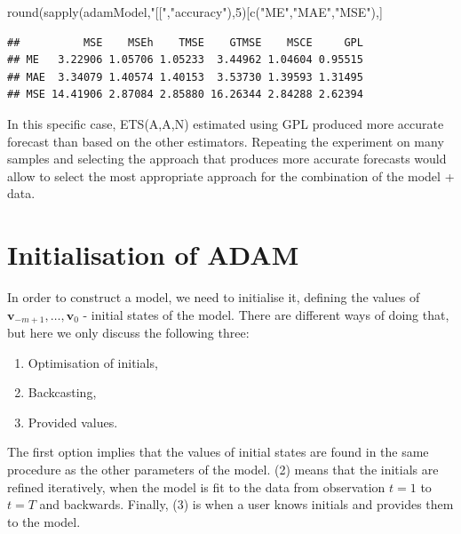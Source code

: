 \documentclass[
]{book}
\newenvironment{Shaded}{\begin{snugshade}}{\end{snugshade}}
\newcommand{\DecValTok}[1]{\textcolor[rgb]{0.00,0.00,0.81}{#1}}
\newcommand{\FunctionTok}[1]{\textcolor[rgb]{0.00,0.00,0.00}{#1}}
\newcommand{\NormalTok}[1]{#1}
\newcommand{\StringTok}[1]{\textcolor[rgb]{0.31,0.60,0.02}{#1}}
\providecommand{\tightlist}{%
  \setlength{\itemsep}{0pt}\setlength{\parskip}{0pt}}
\theoremstyle{definition}
\theoremstyle{definition}
\theoremstyle{definition}
\theoremstyle{definition}
\theoremstyle{remark}
\begin{document}
\begin{Shaded}
\begin{Highlighting}[]
\FunctionTok{round}\NormalTok{(}\FunctionTok{sapply}\NormalTok{(adamModel,}\StringTok{"[["}\NormalTok{,}\StringTok{"accuracy"}\NormalTok{),}\DecValTok{5}\NormalTok{)[}\FunctionTok{c}\NormalTok{(}\StringTok{"ME"}\NormalTok{,}\StringTok{"MAE"}\NormalTok{,}\StringTok{"MSE"}\NormalTok{),]}
\end{Highlighting}
\end{Shaded}

\begin{verbatim}
##          MSE    MSEh    TMSE    GTMSE    MSCE     GPL
## ME   3.22906 1.05706 1.05233  3.44962 1.04604 0.95515
## MAE  3.34079 1.40574 1.40153  3.53730 1.39593 1.31495
## MSE 14.41906 2.87084 2.85880 16.26344 2.84288 2.62394
\end{verbatim}

In this specific case, ETS(A,A,N) estimated using GPL produced more accurate forecast than based on the other estimators. Repeating the experiment on many samples and selecting the approach that produces more accurate forecasts would allow to select the most appropriate approach for the combination of the model + data.

\hypertarget{ADAMInitialisation}{%
\section{Initialisation of ADAM}\label{ADAMInitialisation}}

In order to construct a model, we need to initialise it, defining the values of \(\mathbf{v}_{-m+1}, \dots, \mathbf{v}_0\) - initial states of the model. There are different ways of doing that, but here we only discuss the following three:

\begin{enumerate}
\def\labelenumi{\arabic{enumi}.}
\tightlist
\item
  Optimisation of initials,
\item
  Backcasting,
\item
  Provided values.
\end{enumerate}

The first option implies that the values of initial states are found in the same procedure as the other parameters of the model. (2) means that the initials are refined iteratively, when the model is fit to the data from observation \(t=1\) to \(t=T\) and backwards. Finally, (3) is when a user knows initials and provides them to the model.
\end{document}
